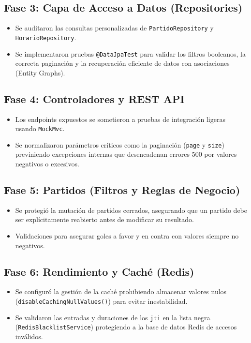 \documentclass[12pt,a4paper]{article}
\begin{document}
\subsection{Fase 3: Capa de Acceso a Datos (Repositories)}
\begin{itemize}
    \item Se auditaron las consultas personalizadas de \texttt{PartidoRepository} y \texttt{HorarioRepository}.
    \item Se implementaron pruebas \texttt{@DataJpaTest} para validar los filtros booleanos, la correcta paginación y la recuperación eficiente de datos con asociaciones (Entity Graphs).
\end{itemize}

\subsection{Fase 4: Controladores y REST API}
\begin{itemize}
    \item Los endpoints expuestos se sometieron a pruebas de integración ligeras usando \texttt{MockMvc}.
    \item Se normalizaron parámetros críticos como la paginación (\texttt{page} y \texttt{size}) previniendo excepciones internas que desencadenan errores 500 por valores negativos o excesivos.
\end{itemize}

\subsection{Fase 5: Partidos (Filtros y Reglas de Negocio)}
\begin{itemize}
    \item Se protegió la mutación de partidos cerrados, asegurando que un partido debe ser explícitamente reabierto antes de modificar su resultado.
    \item Validaciones para asegurar goles a favor y en contra con valores siempre no negativos.
\end{itemize}

\subsection{Fase 6: Rendimiento y Caché (Redis)}
\begin{itemize}
    \item Se configuró la gestión de la caché prohibiendo almacenar valores nulos (\texttt{disableCachingNullValues()}) para evitar inestabilidad.
    \item Se validaron las entradas y duraciones de los \texttt{jti} en la lista negra (\texttt{RedisBlacklistService}) protegiendo a la base de datos Redis de accesos inválidos.
\end{itemize}
\end{document}

